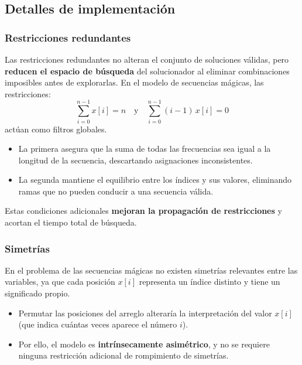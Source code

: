 
\subsection{Detalles de implementación}\label{sec:03-secuencia-magica-impl}

\subsubsection*{Restricciones redundantes}
  Las restricciones redundantes no alteran el conjunto de soluciones válidas, pero \textbf{reducen el espacio de búsqueda} del solucionador al eliminar combinaciones imposibles antes de explorarlas.  
  En el modelo de secuencias mágicas, las restricciones:
  \[
  \sum_{i=0}^{n-1} x[i] = n
  \quad\text{y}\quad
  \sum_{i=0}^{n-1} (i-1)\,x[i] = 0
  \]
  actúan como filtros globales.  
  \begin{itemize}
    \item La primera asegura que la suma de todas las frecuencias sea igual a la longitud de la secuencia, descartando asignaciones inconsistentes.
    \item La segunda mantiene el equilibrio entre los índices y sus valores, eliminando ramas que no pueden conducir a una secuencia válida.
  \end{itemize}
  Estas condiciones adicionales \textbf{mejoran la propagación de restricciones} y acortan el tiempo total de búsqueda.

\subsubsection*{Simetrías}
  En el problema de las secuencias mágicas no existen simetrías relevantes entre las variables, ya que cada posición \(x[i]\) representa un índice distinto y tiene un significado propio.  
  \begin{itemize}
    \item Permutar las posiciones del arreglo alteraría la interpretación del valor \(x[i]\) (que indica cuántas veces aparece el número \(i\)).
    \item Por ello, el modelo es \textbf{intrínsecamente asimétrico}, y no se requiere ninguna restricción adicional de rompimiento de simetrías.
  \end{itemize}